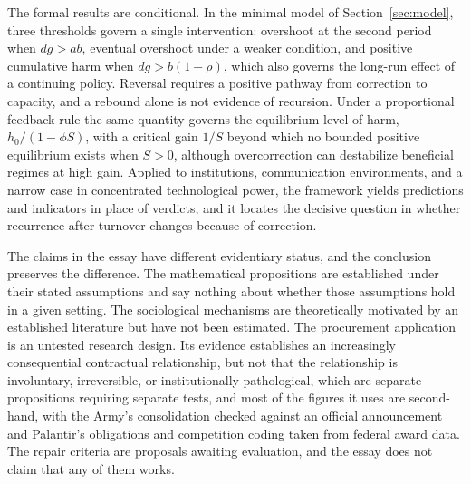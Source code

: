 \documentclass[12pt]{article}
\theoremstyle{remark}
\begin{document}
The formal results are conditional. In the minimal model of Section~\ref{sec:model}, three thresholds govern a single intervention: overshoot at the second period when $dg > ab$, eventual overshoot under a weaker condition, and positive cumulative harm when $dg > b(1-\rho)$, which also governs the long-run effect of a continuing policy. Reversal requires a positive pathway from correction to capacity, and a rebound alone is not evidence of recursion. Under a proportional feedback rule the same quantity governs the equilibrium level of harm, $h_0/(1-\phi S)$, with a critical gain $1/S$ beyond which no bounded positive equilibrium exists when $S > 0$, although overcorrection can destabilize beneficial regimes at high gain. Applied to institutions, communication environments, and a narrow case in concentrated technological power, the framework yields predictions and indicators in place of verdicts, and it locates the decisive question in whether recurrence after turnover changes because of correction.

The claims in the essay have different evidentiary status, and the conclusion preserves the difference. The mathematical propositions are established under their stated assumptions and say nothing about whether those assumptions hold in a given setting. The sociological mechanisms are theoretically motivated by an established literature but have not been estimated. The procurement application is an untested research design. Its evidence establishes an increasingly consequential contractual relationship, but not that the relationship is involuntary, irreversible, or institutionally pathological, which are separate propositions requiring separate tests, and most of the figures it uses are second-hand, with the Army's consolidation checked against an official announcement and Palantir's obligations and competition coding taken from federal award data. The repair criteria are proposals awaiting evaluation, and the essay does not claim that any of them works.
\end{document}
